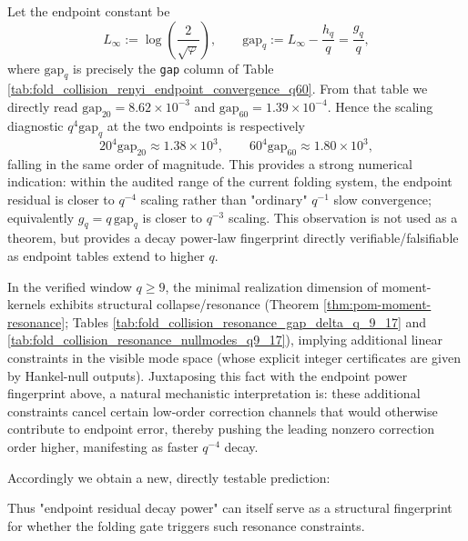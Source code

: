 \begin{remark}\label{rem:pom-endpoint-gap-qminus4}
Let the endpoint constant be
\[
L_\infty:=\log\!\left(\frac{2}{\sqrt{\varphi}}\right),
\qquad
\mathrm{gap}_q:=L_\infty-\frac{h_q}{q}=\frac{g_q}{q},
\]
where \(\mathrm{gap}_q\) is precisely the \texttt{gap} column of Table \ref{tab:fold_collision_renyi_endpoint_convergence_q60}.
From that table we directly read
\(
\mathrm{gap}_{20}=8.62\times 10^{-3}
\)
and
\(
\mathrm{gap}_{60}=1.39\times 10^{-4}
\).
Hence the scaling diagnostic
\(
q^4\mathrm{gap}_q
\)
at the two endpoints is respectively
\[
20^4\mathrm{gap}_{20}\approx 1.38\times 10^3,
\qquad
60^4\mathrm{gap}_{60}\approx 1.80\times 10^3,
\]
falling in the same order of magnitude.
This provides a strong numerical indication: within the audited range of the current folding system, the endpoint residual is closer to \(q^{-4}\) scaling rather than "ordinary" \(q^{-1}\) slow convergence; equivalently \(g_q=q\,\mathrm{gap}_q\) is closer to \(q^{-3}\) scaling.
This observation is not used as a theorem, but provides a decay power-law fingerprint directly verifiable/falsifiable as endpoint tables extend to higher \(q\).
\end{remark}

\begin{remark}\label{rem:pom-endpoint-gap-resonance-link}
In the verified window \(q\ge 9\), the minimal realization dimension of moment-kernels exhibits structural collapse/resonance (Theorem \ref{thm:pom-moment-resonance}; Tables \ref{tab:fold_collision_resonance_gap_delta_q_9_17} and \ref{tab:fold_collision_resonance_nullmodes_q9_17}), implying additional linear constraints in the visible mode space (whose explicit integer certificates are given by Hankel-null outputs).
Juxtaposing this fact with the endpoint power fingerprint above, a natural mechanistic interpretation is: these additional constraints cancel certain low-order correction channels that would otherwise contribute to endpoint error, thereby pushing the leading nonzero correction order higher, manifesting as faster \(q^{-4}\) decay.
\par
Accordingly we obtain a new, directly testable prediction:
\begin{center}
\end{center}
Thus "endpoint residual decay power" can itself serve as a structural fingerprint for whether the folding gate triggers such resonance constraints.
\end{remark}

